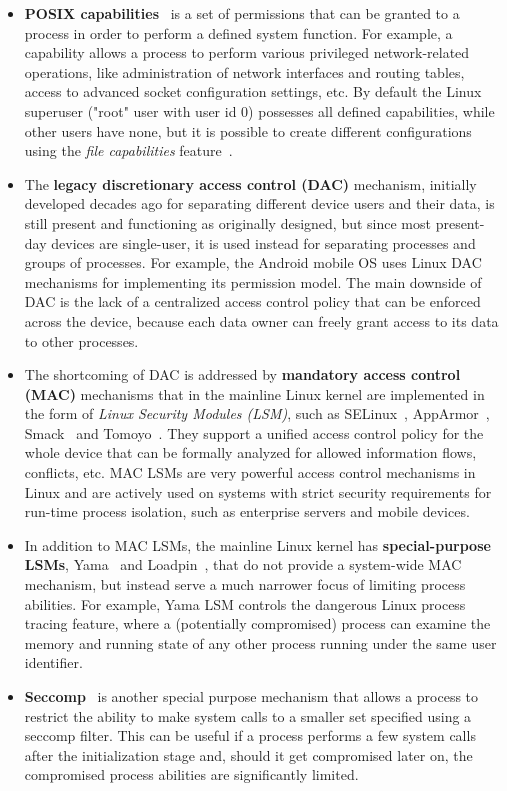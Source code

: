 \begin{itemize}
	\item \textbf{POSIX capabilities}~\cite{caps} is a set of permissions that can be granted to a process in order to perform a defined system function. For example, a  capability allows a process to perform various privileged network-related operations, like administration of network interfaces and routing tables, access to advanced socket configuration settings, etc. By default the Linux superuser ("root" user with user id 0) possesses all defined capabilities, while other users have none, but it is possible to create different configurations using the \textit{file capabilities} feature~\cite{filecaps}. 
	\item The \textbf{legacy discretionary access control (DAC)} mechanism, initially developed decades ago for separating different device users and their data, is still present and functioning as originally designed, but since most present-day devices are single-user, it is used instead for separating processes and groups of processes. For example, the Android mobile OS uses Linux DAC mechanisms for implementing its permission model. The main downside of DAC is the lack of a centralized access control policy that can be enforced across the device, because each data owner can freely grant access to its data to other processes. 
	\item The shortcoming of DAC is addressed by \textbf{mandatory access control (MAC)} mechanisms that in the mainline Linux kernel are implemented in the form of \textit{Linux Security Modules (LSM)}, such as SELinux~\cite{smalley2001implementing}, AppArmor~\cite{bauer2006paranoid}, Smack~\cite{smack} and Tomoyo~\cite{tomoyo}. They support a unified access control policy for the whole device that can be formally analyzed for allowed information flows, conflicts, etc. MAC LSMs are very powerful access control mechanisms in Linux and are actively used on systems with strict security requirements for run-time process isolation, such as enterprise servers and mobile devices. 
	\item In addition to MAC LSMs, the mainline Linux kernel has \textbf{special-purpose LSMs}, Yama~\cite{yama} and Loadpin~\cite{loadpin}, that do not provide a system-wide MAC mechanism, but instead serve a much narrower focus of limiting process abilities. For example, Yama LSM controls the dangerous Linux process tracing feature, where a (potentially compromised) process can examine the memory and running state of any other process running under the same user identifier. 
	\item \textbf{Seccomp}~\cite{seccomp2016} is another special purpose mechanism that allows a process to restrict the ability to make system calls to a smaller set specified using a seccomp filter. This can be useful if a process performs a few system calls after the initialization stage and, should it get compromised later on, the compromised process abilities are significantly limited.
\end{itemize} 

